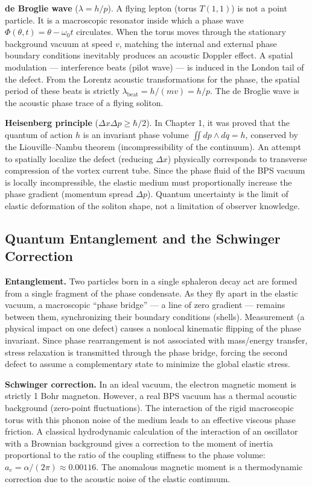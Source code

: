 \documentclass[11pt,a4paper]{article}
\begin{document}
\textbf{de Broglie wave} ($\lambda = h/p$). A flying lepton (torus $T(1,1)$) is not a point particle. It is a macroscopic resonator inside which a phase wave $\Phi(\theta, t) = \theta - \omega_0 t$ circulates. When the torus moves through the stationary background vacuum at speed $v$, matching the internal and external phase boundary conditions inevitably produces an acoustic Doppler effect. A spatial modulation — interference beats (pilot wave) — is induced in the London tail of the defect. From the Lorentz acoustic transformations for the phase, the spatial period of these beats is strictly $\lambda_{\text{beat}} = h / (mv) = h/p$. The de Broglie wave is the acoustic phase trace of a flying soliton.

\textbf{Heisenberg principle} ($\Delta x \Delta p \ge \hbar/2$). In Chapter 1, it was proved that the quantum of action $h$ is an invariant phase volume $\iint dp \wedge dq = h$, conserved by the Liouville–Nambu theorem (incompressibility of the continuum). An attempt to spatially localize the defect (reducing $\Delta x$) physically corresponds to transverse compression of the vortex current tube. Since the phase fluid of the BPS vacuum is locally incompressible, the elastic medium must proportionally increase the phase gradient (momentum spread $\Delta p$). Quantum uncertainty is the limit of elastic deformation of the soliton shape, not a limitation of observer knowledge.

\subsection{Quantum Entanglement and the Schwinger Correction}
\textbf{Entanglement.} Two particles born in a single sphaleron decay act are formed from a single fragment of the phase condensate. As they fly apart in the elastic vacuum, a macroscopic ``phase bridge'' — a line of zero gradient — remains between them, synchronizing their boundary conditions (shells). Measurement (a physical impact on one defect) causes a nonlocal kinematic flipping of the phase invariant. Since phase rearrangement is not associated with mass/energy transfer, stress relaxation is transmitted through the phase bridge, forcing the second defect to assume a complementary state to minimize the global elastic stress.

\textbf{Schwinger correction.} In an ideal vacuum, the electron magnetic moment is strictly 1 Bohr magneton. However, a real BPS vacuum has a thermal acoustic background (zero-point fluctuations). The interaction of the rigid macroscopic torus with this phonon noise of the medium leads to an effective viscous phase friction. A classical hydrodynamic calculation of the interaction of an oscillator with a Brownian background gives a correction to the moment of inertia proportional to the ratio of the coupling stiffness to the phase volume: $a_e = \alpha / (2\pi) \approx 0.00116$. The anomalous magnetic moment is a thermodynamic correction due to the acoustic noise of the elastic continuum.
\end{document}
